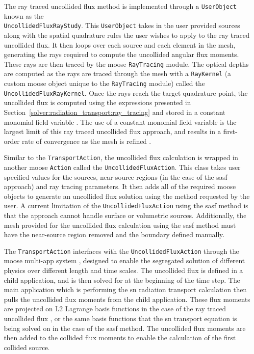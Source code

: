 The ray traced uncollided flux method is implemented through a \texttt{UserObject} known as the \\\texttt{UncollidedFluxRayStudy}. This \texttt{UserObject} takes in the user provided sources along with the spatial quadrature rules the user wishes to apply to the ray traced uncollided flux. It then loops over each source and each element in the mesh, generating the rays required to compute the uncollided angular flux moments. These rays are then traced by the \acrshort{moose} \texttt{RayTracing} module. The optical depths are computed as the rays are traced through the mesh with a \texttt{RayKernel} (a custom \acrshort{moose} object unique to the \texttt{RayTracing} module) called the \texttt{UncollidedFluxRayKernel}. Once the rays reach the target quadrature point, the uncollided flux is computed using the expressions presented in Section~\ref{solver:radiation_transport:ray_tracing} and stored in a constant monomial field variable \cite{harbour_uncollided}. The use of a constant monomial field variable is the largest limit of this ray traced uncollided flux approach, and results in a first-order rate of convergence as the mesh is refined \cite{harbour_uncollided}.

Similar to the \texttt{TransportAction}, the uncollided flux calculation is wrapped in another \acrshort{moose} \texttt{Action} called the \texttt{UncollidedFluxAction}. This class takes user specified values for the sources, near-source regions (in the case of the \acrshort{sasf} approach) and ray tracing parameters. It then adds all of the required \acrshort{moose} objects to generate an uncollided flux solution using the method requested by the user. A current limitation of the \texttt{UncollidedFluxAction} using the \acrshort{sasf} method is that the approach cannot handle surface or volumetric sources. Additionally, the mesh provided for the uncollided flux calculation using the \acrshort{sasf} method must have the near-source region removed and the boundary defined manually. 

The \texttt{TransportAction} interfaces with the \texttt{UncollidedFluxAction} through the \acrshort{moose} multi-app system \cite{moose_coupling}, designed to enable the segregated solution of different physics over different length and time scales. The uncollided flux is defined in a child application, and is then solved for at the beginning of the time step. The main application which is performing the \acrshort{sn} radiation transport calculation then pulls the uncollided flux moments from the child application. These flux moments are projected on L2 Lagrange basis functions in the case of the ray traced uncollided flux \cite{harbour_uncollided}, or the same basis functions that the \acrshort{sn} transport equation is being solved on in the case of the \acrshort{sasf} method. The uncollided flux moments are then added to the collided flux moments to enable the calculation of the first collided source. 

